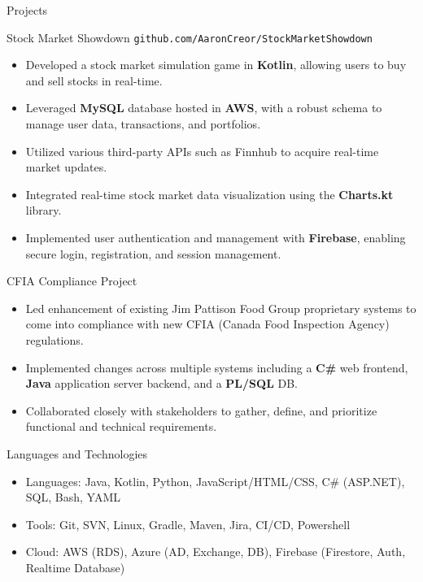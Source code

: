 \documentclass[]{mcdowellcv}
\begin{document}
	\begin{cvsection}{Projects}
		\begin{cvsubsection}{Stock Market Showdown}{}{}
		\texttt{github.com/AaronCreor/StockMarketShowdown}
			\begin{itemize}
				\item Developed a stock market simulation game in \textbf{Kotlin}, allowing users to buy and sell stocks in real-time.
				\item Leveraged \textbf{MySQL} database hosted in \textbf{AWS}, with a robust schema to manage user data, transactions, and portfolios.
				\item Utilized various third-party APIs such as Finnhub to acquire real-time market updates.
				\item Integrated real-time stock market data visualization using the \textbf{Charts.kt} library.
				\item Implemented user authentication and management with \textbf{Firebase}, enabling secure login, registration, and session management.
			\end{itemize}
		\end{cvsubsection}
		\begin{cvsubsection}{CFIA Compliance Project}{}{}
			\begin{itemize}
				\item Led enhancement of existing Jim Pattison Food Group proprietary systems to come into compliance with new CFIA (Canada Food Inspection Agency) regulations.
				\item Implemented changes across multiple systems including a \textbf{C\#} web frontend, \textbf{Java} application server backend, and a \textbf{PL/SQL} DB.
				\item Collaborated closely with stakeholders to gather, define, and prioritize functional and technical requirements.
			\end{itemize}
		\end{cvsubsection}
	\end{cvsection}
	
	\begin{cvsection}{Languages and Technologies}
		\begin{cvsubsection}{}{}{}	
			\begin{itemize}
				\item Languages: Java, Kotlin, Python, JavaScript/HTML/CSS, C\# (ASP.NET), SQL, Bash, YAML
				\item Tools: Git, SVN, Linux, Gradle, Maven, Jira, CI/CD, Powershell
				\item Cloud: AWS (RDS), Azure (AD, Exchange, DB), Firebase (Firestore, Auth, Realtime Database)
			\end{itemize}
		\end{cvsubsection}
	\end{cvsection}
	
\end{document}
